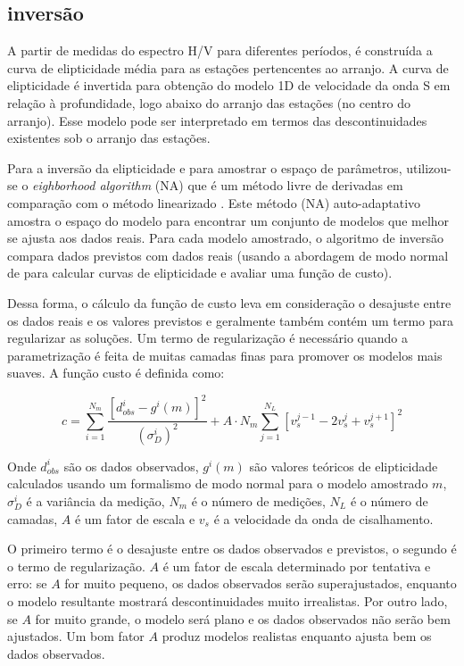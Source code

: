 \documentclass[smallextended]{svjour3}       %
\begin{document}
\subsection{inversão}

A partir de medidas do espectro H/V para diferentes períodos, é construída a curva de elipticidade média para as estações pertencentes ao arranjo. A curva de elipticidade é invertida para obtenção do modelo 1D de velocidade da onda S em relação à profundidade, logo abaixo do arranjo das estações (no centro do arranjo). Esse modelo pode ser interpretado em termos das descontinuidades existentes sob o arranjo das estações.

Para a inversão da elipticidade e para amostrar o espaço de parâmetros, utilizou-se o \textit{eighborhood algorithm} (NA) \citep{wathelet2008array} que é um método livre de derivadas em comparação com o método linearizado \citep{menke1989geophysical}. Este método (NA) auto-adaptativo amostra o espaço do modelo para encontrar um conjunto de modelos que melhor se ajusta aos dados reais. Para cada modelo amostrado, o algoritmo de inversão compara dados previstos com dados reais (usando a abordagem de modo normal de \cite{herrmann2013computer} para calcular curvas de elipticidade e avaliar uma função de custo). 

Dessa forma, o cálculo da função de custo leva em consideração o desajuste entre os dados reais e os valores previstos e geralmente também contém um termo para regularizar as soluções. Um termo de regularização é necessário quando a parametrização é feita de muitas camadas finas para promover os modelos mais suaves. A função custo é definida como:

\begin{equation}\label{eq:cost_function}
  c = \sum_{i=1}^{N_m} \frac{[d_{obs}^i - g^i(m)]^2}{(\sigma^i_{D})^2} + A \cdot N_m \sum_{j=1}^{N_L} [v_s^{j - 1} - 2v_s^{j} + v_s^{j + 1}]^2 
\end{equation}

Onde $d_{obs}^i$ são os dados observados, $g^i(m)$ são valores teóricos de elipticidade calculados usando um formalismo de modo normal para o modelo amostrado $m$, $\sigma^i_{D}$ é a variância da medição, $N_m$ é o número de medições, $N_L$ é o número de camadas, $A$ é um fator de escala e $v_s$ é a velocidade da onda de cisalhamento. 

O primeiro termo é o desajuste entre os dados observados e previstos, o segundo é o termo de regularização. $A$ é um fator de escala determinado por tentativa e erro: se $A$ for muito pequeno, os dados observados serão superajustados, enquanto o modelo resultante mostrará descontinuidades muito irrealistas. Por outro lado, se $A$ for muito grande, o modelo será plano e os dados observados não serão bem ajustados. Um bom fator $A$ produz modelos realistas enquanto ajusta bem os dados observados. 
\end{document}
